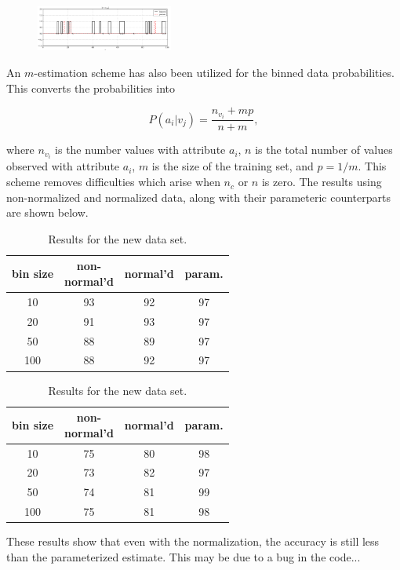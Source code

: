 \begin{multicols}{2}
\begin{figure}[H]
  \centering
		\includegraphics[width=0.4\textwidth]{images/normed_new_results.png}
\end{figure}

\end{multicols}

\newpage

An $m$-estimation scheme has also been utilized for the binned data probabilities.  This converts the probabilities into

$$P(a_i | v_j) = \frac{n_{v_i} + mp}{n + m},$$

where $n_{v_i}$ is the number values with attribute $a_i$, $n$ is the total number of values observed with attribute $a_i$, $m$ is the size of the training set, and $p=1/m$.  This scheme removes difficulties which arise when $n_c$ or $n$ is zero.  The results using non-normalized and normalized data, along with their parameteric counterparts are shown below.

\begin{table}[H]
\parbox{.45\linewidth}
{
  \centering
  \begin{tabular}{ c | c c c }
    bin size & \specialcell{non-\\normal'd} & normal'd & param. \\
    \hline
    10  & 93 & 92 & 97 \\
    20  & 91 & 93 & 97 \\
    50  & 88 & 89 & 97 \\
    100 & 88 & 92 & 97 \\
  \end{tabular}
  \caption{Results for the original data set.}
  \label{tbl:tablelabel}
}
\hfill
\parbox{.45\linewidth}
{
  \centering
  \begin{tabular}{ c | c c c }
    bin size & \specialcell{non-\\normal'd} & normal'd & param. \\
    \hline
    10  & 75 & 80 & 98 \\
    20  & 73 & 82 & 97 \\
    50  & 74 & 81 & 99 \\
    100 & 75 & 81 & 98 \\
  \end{tabular}
  \caption{Results for the new data set.}
  \label{tbl:tablelabel}
}
\end{table}

These results show that even with the normalization, the accuracy is still less than the parameterized estimate.  This may be due to a bug in the code...
 







